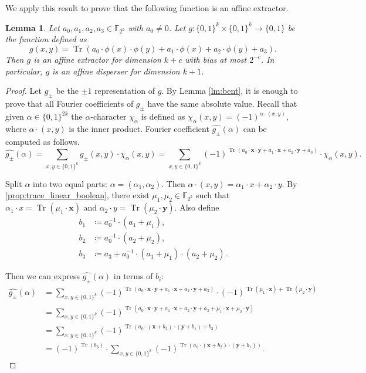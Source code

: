 \documentclass[a4paper,11pt,draft]{article}
\newtheorem{lemma}[theorem]{Lemma}
\theoremstyle{definition}
\theoremstyle{remark}
\DeclareMathOperator{\Tr}{Tr}
\newcommand{\iso}[1]{\mathbf{#1}}
\newcommand{\Q}{{\{0,1\}}}
\newcommand{\bbF}{\mathbb{F}}
\begin{document}
We apply this result to prove that the following function is an affine extractor.
\begin{lemma}\label{lem:trace_affine_extractor}
  Let $a_0, a_1, a_2, a_3 \in \bbF_{2^k}$ with $a_0 \ne 0$. Let $g\colon \Q^k \times \Q^k \to \Q$ be the function defined as
  \[
    g(x, y) = \Tr(a_0 \cdot \phi(x) \cdot \phi(y) + a_1 \cdot \phi(x) + a_2 \cdot \phi(y) + a_3).
  \]
  Then $g$ is an affine extractor for dimension $k+c$ with bias at most $2^{-c}$.
  In particular, $g$ is an affine disperser for dimension $k+1$.
\end{lemma}
\begin{proof}
  Let $g_\pm$ be the $\pm 1$ representation of $g$. By Lemma \ref{lm:bent}, it is enough to prove that all Fourier coefficients of $g_\pm$ have the same absolute value. Recall that given $\alpha \in \Q^{2k}$ the $\alpha$-character $\chi_\alpha$ is defined as $\chi_\alpha(x, y) = {(-1)}^{\alpha \cdot (x, y)}$, where $\alpha \cdot (x, y)$ is the inner product. Fourier coefficient $\widehat{g_\pm}(\alpha)$ can be computed as follows.
  \[
    \widehat{g_\pm}(\alpha) = \sum_{x,y \in \Q^k} g_\pm(x, y) \cdot \chi_\alpha(x, y) = \sum_{x,y \in \Q^k} {(-1)}^{\Tr(a_0 \cdot \iso{x} \cdot \iso{y} + a_1 \cdot \iso{x} + a_2 \cdot \iso{y} + a_3)} \cdot \chi_\alpha(x, y).
  \]

    Split $\alpha$ into two equal parts: $\alpha = (\alpha_1, \alpha_2)$. Then $\alpha \cdot (x, y) = \alpha_1 \cdot x + \alpha_2 \cdot y$.
  By \cref{prop:trace_linear_boolean}, there exist $\mu_1, \mu_2 \in \bbF_{2^k}$ such that $\alpha_1 \cdot x = \Tr(\mu_1 \cdot \iso{x})$ and $\alpha_2 \cdot y = \Tr(\mu_2 \cdot \iso{y})$. Also define
  \begin{align*}
    b_1 &\coloneqq a_0^{-1} \cdot (a_1 + \mu_1), \\
    b_2 &\coloneqq a_0^{-1} \cdot (a_2 + \mu_2), \\
    b_3 &\coloneqq a_3 + a_0^{-1} \cdot (a_1 + \mu_1) \cdot (a_2 + \mu_2).
  \end{align*}

  Then we can express $\widehat{g_\pm}(\alpha)$ in terms of $b_i$:
  \begin{align*}
    \widehat{g_\pm}(\alpha) &=
    \sum\limits_{x,y \in \Q^k} {(-1)}^{\Tr(a_0 \cdot \iso{x} \cdot \iso{y} + a_1 \cdot \iso{x} + a_2 \cdot \iso{y} + a_3)} \cdot {(-1)}^{\Tr(\mu_1 \cdot \iso{x}) + \Tr(\mu_2 \cdot \iso{y})} \\ &=
    \sum\limits_{x,y \in \Q^k} {(-1)}^{\Tr(a_0 \cdot \iso{x} \cdot \iso{y} + a_1 \cdot \iso{x} + a_2 \cdot \iso{y} + a_3 + \mu_1 \cdot \iso{x} + \mu_2 \cdot \iso{y})} \\ &=
    \sum\limits_{x,y \in \Q^k} {(-1)}^{\Tr(a_0 \cdot (\iso{x} + b_2) \cdot (\iso{y} + b_1) + b_3)} \\ &=
    {(-1)}^{\Tr(b_3)} \cdot \sum\limits_{x,y \in \Q^k} {(-1)}^{\Tr(a_0 \cdot (\iso{x} + b_2) \cdot (\iso{y} + b_1))}.
  \end{align*}


\end{proof}
\end{document}
